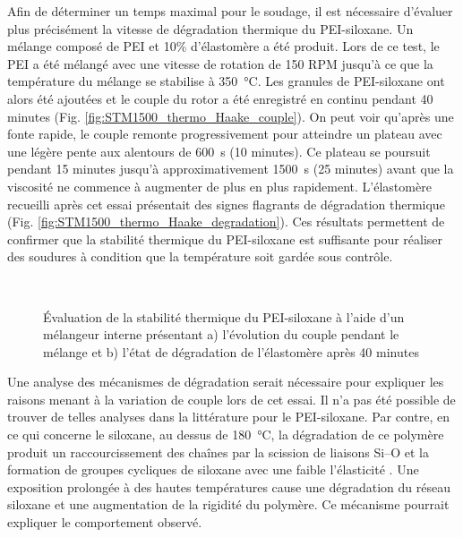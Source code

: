 Afin de déterminer un temps maximal pour le soudage, il est nécessaire d'évaluer plus précisément la vitesse de dégradation thermique du PEI-siloxane. 
Un mélange composé de PEI et 10\% d'élastomère a été produit. 
Lors de ce test, le PEI a été mélangé avec une vitesse de rotation de 150 RPM jusqu'à ce que la température du mélange se stabilise à \SI[locale=FR]{350}{\celsius}. 
Les granules de PEI-siloxane ont alors été ajoutées et le couple du rotor a été enregistré en continu pendant 40 minutes (Fig. \ref{fig:STM1500_thermo_Haake_couple}). 
On peut voir qu'après une fonte rapide, le couple remonte progressivement pour atteindre un plateau avec une légère pente aux alentours de \SI[locale=FR]{600}{\second} (10 minutes). 
Ce plateau se poursuit pendant 15 minutes jusqu'à approximativement \SI[locale=FR]{1500}{\second} (25 minutes) avant que la viscosité ne commence à augmenter de plus en plus rapidement. 
L'élastomère recueilli après cet essai présentait des signes flagrants de dégradation thermique (Fig. \ref{fig:STM1500_thermo_Haake_degradation}). 
Ces résultats permettent de confirmer que la stabilité thermique du PEI-siloxane est suffisante pour réaliser des soudures à condition que la température soit gardée sous contrôle. 

\begin{figure}[h]	
	\centering
	 \qquad
	 \\
	\caption{Évaluation de la stabilité thermique du PEI-siloxane à l'aide d'un mélangeur interne présentant a) l'évolution du couple pendant le mélange et b) l'état de dégradation de l'élastomère après 40 minutes}
	\label{fig:STM1500_thermo_Haake}
\end{figure}

Une analyse des mécanismes de dégradation serait nécessaire pour expliquer les raisons menant à la variation de couple lors de cet essai. 
Il n'a pas été possible de trouver de telles analyses dans la littérature pour le PEI-siloxane. 
Par contre, en ce qui concerne le siloxane, au dessus de \SI{180}{\celsius}, la dégradation de ce polymère produit un raccourcissement des chaînes par la scission de liaisons Si--O  et la formation de groupes cycliques de siloxane avec une faible l'élasticité \cite{Heinemann2004}. 
Une exposition prolongée à des hautes températures cause une dégradation du réseau siloxane et une augmentation de la rigidité du polymère. 
Ce mécanisme pourrait expliquer le comportement observé.  

